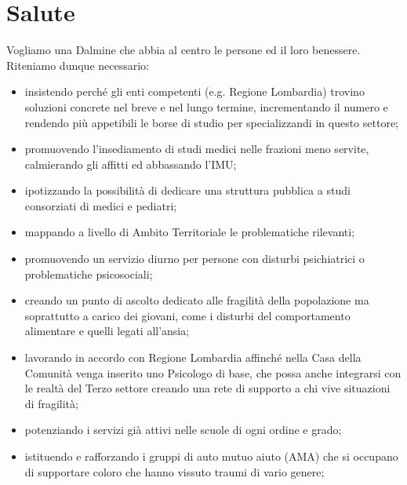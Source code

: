 \section{Salute}
Vogliamo una Dalmine che abbia al centro le persone ed il loro benessere. Riteniamo dunque necessario:

\begin{bluebox}
\begin{itemize}
  \item insistendo perché gli enti competenti (e.g. Regione Lombardia) trovino soluzioni concrete nel breve e nel lungo termine, incrementando il numero e rendendo più appetibili le borse di studio per specializzandi in questo settore;
  \item promuovendo l'insediamento di studi medici nelle frazioni meno servite, calmierando gli affitti ed abbassando l'IMU;
  \item ipotizzando la possibilità di dedicare una struttura pubblica a studi consorziati di medici e pediatri;
\end{itemize}
\end{bluebox}

\begin{bluebox}
\begin{itemize}
  \item mappando a livello di Ambito Territoriale le problematiche rilevanti;
  \item promuovendo un servizio diurno per persone con disturbi psichiatrici o problematiche psicosociali;
  \item creando un punto di ascolto dedicato alle fragilità della popolazione ma soprattutto a carico dei giovani, come i disturbi del comportamento alimentare e quelli legati all'ansia;
  \item lavorando in accordo con Regione Lombardia affinché nella Casa della Comunità venga inserito uno Psicologo di base, che possa anche integrarsi con le realtà del Terzo settore creando una rete di supporto a chi vive situazioni di fragilità;
  \item potenziando i servizi già attivi nelle scuole di ogni ordine e grado;
  \item istituendo e rafforzando i gruppi di auto mutuo aiuto (AMA) che si occupano di supportare coloro che hanno vissuto traumi di vario genere;
\end{itemize}
\end{bluebox}

